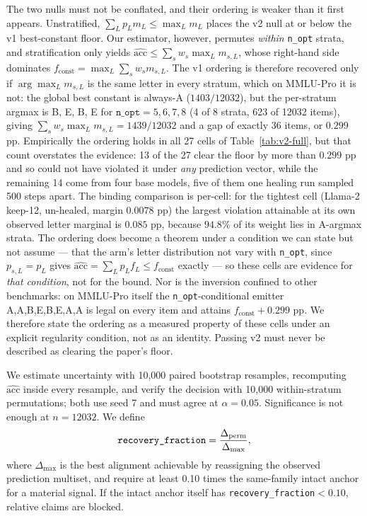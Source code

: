 The two nulls must not be conflated, and their ordering is weaker than it first appears. Unstratified, $\sum_L p_{L}m_{L}\leq\max_Lm_{L}$ places the v2 null at or below the v1 best-constant floor. Our estimator, however, permutes \emph{within} \texttt{n\_opt} strata, and stratification only yields $\widehat{\mathrm{acc}}\leq\sum_s w_s\max_L m_{s,L}$, whose right-hand side dominates $f_{\mathrm{const}}=\max_L\sum_s w_s m_{s,L}$. The v1 ordering is therefore recovered only if $\arg\max_L m_{s,L}$ is the same letter in every stratum, which on MMLU-Pro it is not: the global best constant is always-A ($1403/12032$), but the per-stratum argmax is B, E, B, E for $\texttt{n\_opt}=5,6,7,8$ (4 of 8 strata, 623 of 12032 items), giving $\sum_s w_s\max_L m_{s,L}=1439/12032$ and a gap of exactly $36$ items, or $0.299$ pp. Empirically the ordering holds in all 27 cells of Table~\ref{tab:v2-full}, but that count overstates the evidence: 13 of the 27 clear the floor by more than $0.299$ pp and so could not have violated it under \emph{any} prediction vector, while the remaining 14 come from four base models, five of them one healing run sampled 500 steps apart. The binding comparison is per-cell: for the tightest cell (Llama-2 keep-12, un-healed, margin $0.0078$ pp) the largest violation attainable at its own observed letter marginal is $0.085$ pp, because $94.8\%$ of its weight lies in A-argmax strata. The ordering does become a theorem under a condition we can state but not assume --- that the arm's letter distribution not vary with \texttt{n\_opt}, since $p_{s,L}=p_{L}$ gives $\widehat{\mathrm{acc}}=\sum_L p_{L}f_{L}\leq f_{\mathrm{const}}$ exactly --- so these cells are evidence for \emph{that condition}, not for the bound. Nor is the inversion confined to other benchmarks: on MMLU-Pro itself the \texttt{n\_opt}-conditional emitter A,A,B,E,B,E,A,A is legal on every item and attains $f_{\mathrm{const}}+0.299$ pp. We therefore state the ordering as a measured property of these cells under an explicit regularity condition, not as an identity. Passing v2 must never be described as clearing the paper's floor.



We estimate uncertainty with 10,000 paired bootstrap resamples, recomputing $\widehat{\mathrm{acc}}$ inside every resample, and verify the decision with 10,000 within-stratum permutations; both use seed 7 and must agree at $\alpha=0.05$. Significance is not enough at $n=12032$. We define
\begin{equation}
\text{\texttt{recovery\_fraction}}=\frac{\Delta_{\mathrm{perm}}}{\Delta_{\max}},
\end{equation}
where $\Delta_{\max}$ is the best alignment achievable by reassigning the observed prediction multiset, and require at least 0.10 times the same-family intact anchor for a material signal. If the intact anchor itself has \texttt{recovery\_fraction}$<0.10$, relative claims are blocked.

